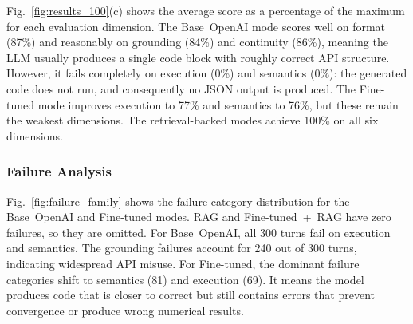 \documentclass[journal]{IEEEtran}
\begin{document}
Fig.~\ref{fig:results_100}(c) shows the average score as a percentage of the maximum for each evaluation dimension.
The Base~OpenAI mode scores well on format (87\%) and reasonably on grounding (84\%) and continuity (86\%), meaning the LLM usually produces a single code block with roughly correct API structure.
However, it fails completely on execution (0\%) and semantics (0\%): the generated code does not run, and consequently no JSON output is produced.
The Fine-tuned mode improves execution to 77\% and semantics to 76\%, but these remain the weakest dimensions.
The retrieval-backed modes achieve 100\% on all six dimensions.


\subsubsection{Failure Analysis}

Fig.~\ref{fig:failure_family} shows the failure-category distribution for the Base~OpenAI and Fine-tuned modes. RAG and Fine-tuned~+~RAG have zero failures, so they are omitted.
For Base~OpenAI, all 300 turns fail on execution and semantics. The grounding failures account for 240 out of 300 turns, indicating widespread API misuse.
For Fine-tuned, the dominant failure categories shift to semantics (81) and execution (69). It means the model produces code that is closer to correct but still contains errors that prevent convergence or produce wrong numerical results.
\end{document}
